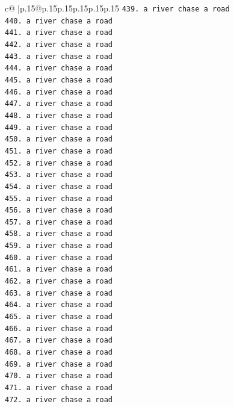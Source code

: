 \documentclass{article}
\begin{document}
{\begin{supertabular}{c@{$\;$}|p{.15\linewidth}@{}p{.15\linewidth}p{.15\linewidth}p{.15\linewidth}p{.15\linewidth}p{.15\linewidth}}
{{{\texttt{439. a river chase a road} \\
\texttt{440. a river chase a road} \\
\texttt{441. a river chase a road} \\
\texttt{442. a river chase a road} \\
\texttt{443. a river chase a road} \\
\texttt{444. a river chase a road} \\
\texttt{445. a river chase a road} \\
\texttt{446. a river chase a road} \\
\texttt{447. a river chase a road} \\
\texttt{448. a river chase a road} \\
\texttt{449. a river chase a road} \\
\texttt{450. a river chase a road} \\
\texttt{451. a river chase a road} \\
\texttt{452. a river chase a road} \\
\texttt{453. a river chase a road} \\
\texttt{454. a river chase a road} \\
\texttt{455. a river chase a road} \\
\texttt{456. a river chase a road} \\
\texttt{457. a river chase a road} \\
\texttt{458. a river chase a road} \\
\texttt{459. a river chase a road} \\
\texttt{460. a river chase a road} \\
\texttt{461. a river chase a road} \\
\texttt{462. a river chase a road} \\
\texttt{463. a river chase a road} \\
\texttt{464. a river chase a road} \\
\texttt{465. a river chase a road} \\
\texttt{466. a river chase a road} \\
\texttt{467. a river chase a road} \\
\texttt{468. a river chase a road} \\
\texttt{469. a river chase a road} \\
\texttt{470. a river chase a road} \\
\texttt{471. a river chase a road} \\
\texttt{472. a river chase a road} \\
}}}
\end{supertabular}}
\end{document}
